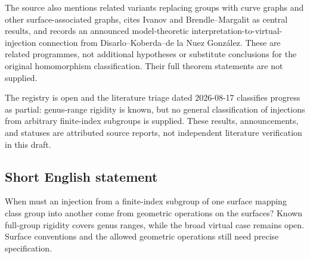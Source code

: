 \documentclass[11pt]{article}
\begin{document}
The source also mentions related variants replacing groups with curve graphs and other surface-associated graphs, cites Ivanov and Brendle--Margalit as central results, and records an announced model-theoretic interpretation-to-virtual-injection connection from Disarlo--Koberda--de la Nuez González. These are related programmes, not additional hypotheses or substitute conclusions for the original homomorphism classification. Their full theorem statements are not supplied.

The registry is open and the literature triage dated 2026-08-17 classifies progress as partial: genus-range rigidity is known, but no general classification of injections from arbitrary finite-index subgroups is supplied. These results, announcements, and statuses are attributed source reports, not independent literature verification in this draft.
\subsection{Short English statement}
When must an injection from a finite-index subgroup of one surface mapping class group into another come from geometric operations on the surfaces? Known full-group rigidity covers genus ranges, while the broad virtual case remains open. Surface conventions and the allowed geometric operations still need precise specification.
\end{document}
